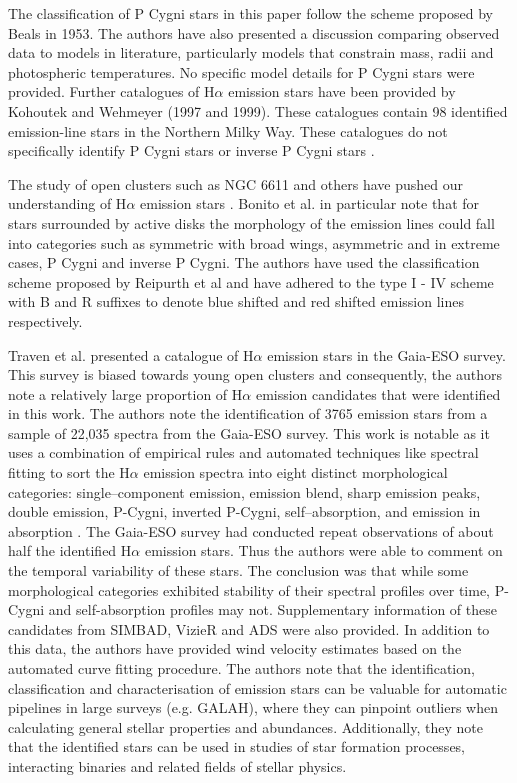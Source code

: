 The classification of P Cygni stars in this paper follow the scheme proposed by Beals in 1953\cite{1953PDAO....9....1B}. The authors have also presented a discussion comparing observed data to models in literature, particularly models that constrain mass, radii and photospheric temperatures. No specific model details for P Cygni stars were provided. Further catalogues of H$\alpha$ emission stars have been provided by Kohoutek and Wehmeyer (1997 and 1999). These catalogues contain 98 identified emission-line stars in the Northern Milky Way. These catalogues do not specifically identify P Cygni stars or inverse P Cygni stars \cite{kohoutek1999catalogue}.

The study of open clusters such as NGC 6611 and others have pushed our understanding of H$\alpha$ emission stars \cite{bonito2013spectroscopic,traven2015gaia}. Bonito et al. in particular note that for stars surrounded by active disks the morphology of the emission lines could fall into categories such as symmetric with broad wings, asymmetric and in extreme cases, P Cygni and inverse P Cygni. The authors have used the classification scheme proposed by Reipurth et al and have adhered to the type I - IV scheme with B and R suffixes to denote blue shifted and red shifted emission lines respectively. 

Traven et al. presented a catalogue of H$\alpha$ emission stars in the Gaia-ESO survey. This survey is biased towards young open clusters and consequently, the authors note a relatively large proportion of H$\alpha$ emission candidates that were identified in this work. The authors note the identification of 3765 emission stars from a sample of 22,035 spectra from the Gaia-ESO survey. This work is notable as it uses a combination of empirical rules and automated techniques like spectral fitting to sort the H$\alpha$ emission spectra into eight distinct morphological categories: single–component emission, emission blend, sharp emission peaks, double emission, P-Cygni, inverted P-Cygni, self–absorption, and emission in absorption \cite{traven2015gaia}. The Gaia-ESO survey had conducted repeat observations of about half the identified H$\alpha$ emission stars. Thus the authors were able to comment on the temporal variability of these stars. The conclusion was that while some morphological categories exhibited stability of their spectral profiles over time, P-Cygni and self-absorption profiles may not. Supplementary information of these candidates from SIMBAD, VizieR and ADS were also provided. In addition to this data, the authors have provided wind velocity estimates based on the automated curve fitting procedure. The authors note that the identification, classification and characterisation of emission stars can be valuable for automatic pipelines in large surveys (e.g. GALAH), where they can pinpoint outliers when calculating general stellar properties and abundances. Additionally, they note that the identified stars can be used in studies of star formation processes, interacting binaries and related fields of stellar physics. 

